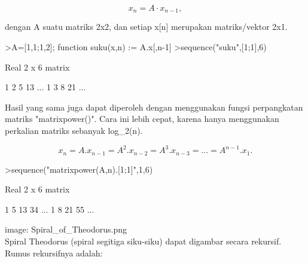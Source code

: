 \documentclass[a4paper,10pt]{article}
\begin{document}
\begin{eulernotebook}
\begin{eulercomment}
\begin{eulercomment}
\begin{eulercomment}
\begin{eulercomment}
\begin{eulercomment}
\begin{eulercomment}
\begin{eulercomment}
\begin{eulercomment}
\begin{eulercomment}
\begin{eulercomment}
\begin{eulercomment}
\begin{eulercomment}
\begin{eulercomment}
\begin{eulercomment}
\begin{eulercomment}
\end{eulercomment}
\begin{eulerformula}
\[
x_n =A \cdot x_{n-1},
\]
\end{eulerformula}
\begin{eulercomment}
dengan A suatu matriks 2x2, dan setiap x[n] merupakan matriks/vektor
2x1.
\end{eulercomment}
\begin{eulerprompt}
>A=[1,1;1,2]; function suku(x,n) := A.x[,n-1]
>sequence("suku",[1;1],6)
\end{eulerprompt}
\begin{euleroutput}
  Real 2 x 6 matrix
  
              1             2             5            13     ...
              1             3             8            21     ...
\end{euleroutput}
\begin{eulercomment}
Hasil yang sama juga dapat diperoleh dengan menggunakan fungsi
perpangkatan matriks "matrixpower()". Cara ini lebih cepat, karena
hanya menggunakan perkalian matriks sebanyak log\_2(n).

\end{eulercomment}
\begin{eulerformula}
\[
x_n=A.x_{n-1}=A^2.x_{n-2}=A^3.x_{n-3}= ... = A^{n-1}.x_1.
\]
\end{eulerformula}
\begin{eulerprompt}
>sequence("matrixpower(A,n).[1;1]",1,6)
\end{eulerprompt}
\begin{euleroutput}
  Real 2 x 6 matrix
  
              1             5            13            34     ...
              1             8            21            55     ...
\end{euleroutput}
\begin{eulercomment}
image: Spiral\_of\_Theodorus.png\\
Spiral Theodorus (spiral segitiga siku-siku) dapat digambar secara
rekursif. Rumus rekursifnya adalah:


\end{eulercomment}
\end{eulercomment}
\end{eulercomment}
\end{eulercomment}
\end{eulercomment}
\end{eulercomment}
\end{eulercomment}
\end{eulercomment}
\end{eulercomment}
\end{eulercomment}
\end{eulercomment}
\end{eulercomment}
\end{eulercomment}
\end{eulercomment}
\end{eulercomment}
\end{eulernotebook}
\end{document}
